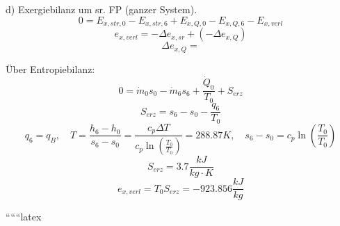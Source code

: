 d) Exergiebilanz um sr. FP (ganzer System). \\
\[
0 = E_{x,str,0} - E_{x,str,6} + E_{x,Q,0} - E_{x,Q,6} - E_{x,verl}
\]
\[
e_{x,verl} = -\Delta e_{x,sr} + (-\Delta e_{x,Q})
\]
\[
\Delta e_{x,Q} =
\]

Über Entropiebilanz: \\
\[
0 = \dot{m}_0 s_0 - \dot{m}_6 s_6 + \frac{\dot{Q}_0}{T_0} + S_{erz}
\]
\[
S_{erz} = s_6 - s_0 - \frac{q_6}{T_0}
\]
\[
q_6 = q_B, \quad T = \frac{h_6 - h_0}{s_6 - s_0} = \frac{c_p \Delta T}{c_p \ln \left( \frac{T_0}{T_0} \right)} = 288.87 K, \quad s_6 - s_0 = c_p \ln \left( \frac{T_0}{T_0} \right)
\]
\[
S_{erz} = 3.7 \frac{kJ}{kg \cdot K}
\]
\[
e_{x,verl} = T_0 S_{erz} = -923.856 \frac{kJ}{kg}
\]

``````latex